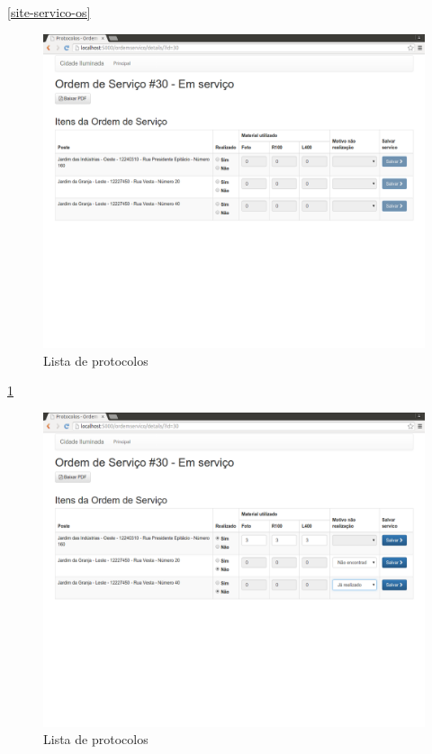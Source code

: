 \documentclass[
	article,			%
	11pt,				%
	oneside,			%
	a4paper,			%
	english,			%
	brazil,				%
	sumario=tradicional
	]{abntex2}
\begin{document}
\ref{site-servico-os}

\begin{figure}[!htbp]
 \centering
 \caption{\label{site-fechamento-urbam}Lista de protocolos}
 \includegraphics[scale=0.25]{site/15-fechamento_urbam.png}
\end{figure}

\ref{site-fechamento-urbam}
\clearpage

\begin{figure}[!htbp]
 \centering
 \caption{\label{site-material-e-motivo}Lista de protocolos}
 \includegraphics[scale=0.25]{site/16-material_e_motivo.png}
\end{figure}
\end{document}
